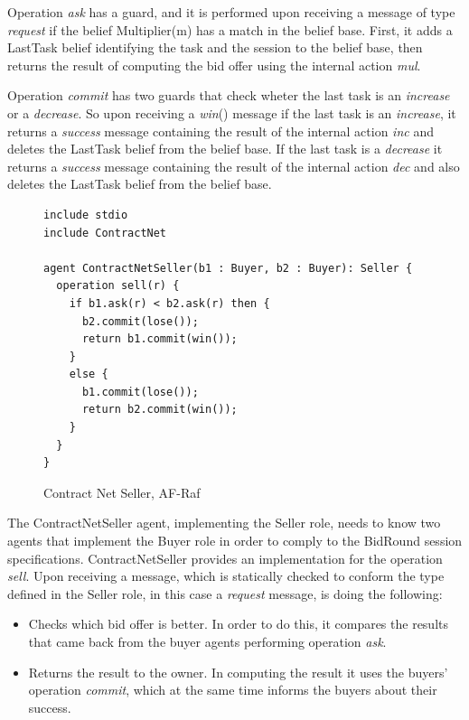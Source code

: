 \documentclass[a4paper,12pt,oneside,fleqn]{book} %
\begin{document}
Operation \textit{ask} has a guard, and it is performed upon receiving a
message of type \textit{request} if the belief Multiplier(m) has a match in
the belief base. First, it adds a LastTask belief identifying the task and
the session to the belief base, then returns the result of computing the
bid offer using the internal action \textit{mul}.

Operation \textit{commit} has two guards that check wheter the last task is
an \textit{increase} or a \textit{decrease}. So upon receiving a
\textit{win}() message if the last task is an \textit{increase}, it returns
a \textit{success} message containing the result of the internal action
\textit{inc} and deletes the LastTask belief from the belief base. If the last
task is a \textit{decrease} it returns a \textit{success} message
containing the result of the internal action \textit{dec} and also deletes
the LastTask belief from the belief base.

\begin{figure}\footnotesize %
\begin{verbatim}
include stdio
include ContractNet

agent ContractNetSeller(b1 : Buyer, b2 : Buyer): Seller {
  operation sell(r) {
    if b1.ask(r) < b2.ask(r) then {
      b2.commit(lose());
      return b1.commit(win());
    }
    else {
      b1.commit(lose());
      return b2.commit(win());
    }
  }
}
\end{verbatim}
\caption{Contract Net Seller, AF-Raf}
\label{fig:contract-seller}
\end{figure} %

The ContractNetSeller agent, implementing the Seller role, needs to know
two agents that implement the Buyer role in order to comply to the BidRound
session specifications. ContractNetSeller provides an implementation for
the operation \textit{sell}. Upon receiving a message, which is statically
checked to conform the type defined in the Seller role, in this case a
\textit{request} message, is doing the following:

\begin{itemize}
\item Checks which bid offer is better. In order to do this, it compares the
results that came back from the buyer agents performing operation
\textit{ask}.
\item Returns the result to the owner. In computing the result it uses the
buyers' operation \textit{commit}, which at the same time informs the
buyers about their success.
\end{itemize}
\end{document}
